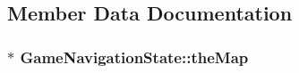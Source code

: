 \subsection{Member Data Documentation}
\hypertarget{class_game_navigation_state_83154f9523275696f30c13447e1d74f3}{
\subsubsection[{theMap}]{$\ast$ {\bf GameNavigationState::theMap}}}
\label{class_game_navigation_state_83154f9523275696f30c13447e1d74f3}


